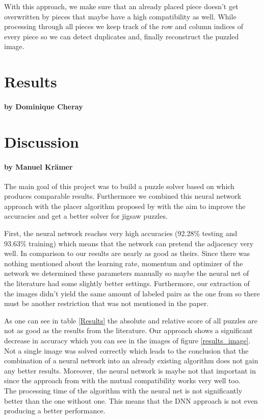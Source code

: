 \documentclass[11pt]{report}
\begin{document}
With this approach, we make sure that an already placed piece doesn't get overwritten by pieces that maybe have a high compatibility as well. While processing through all pieces we keep track of the row and column indices of every piece so we can detect duplicates and, finally reconstruct the puzzled image.


\chapter{Results}
\subsubsection*{by Dominique Cheray}


\chapter{Discussion}
\subsubsection*{by Manuel Krämer}

The main goal of this project was to build a puzzle solver based on \cite{sholomon2016dnn} which produces comparable results. Furthermore we combined this neural network approach with the placer algorithm proposed by \cite{Paikin2015} with the aim to improve the accuracies and get a better solver for jigsaw puzzles.

First, the neural network reaches very high accuracies (92.28\% testing and 93.63\% training) which means that the network can pretend the adjacency very well. In comparison to \cite{sholomon2016dnn} our results are nearly as good as theirs. Since there was nothing mentioned about the learning rate, momentum and optimizer of the network we determined these parameters manually so maybe the neural net of the literature had some slightly better settings. Furthermore, our extraction of the images didn't yield the same amount of labeled pairs as the one from \cite{sholomon2016dnn} so there must be another restriction that was not mentioned in the paper.

As one can see in table \ref{Results} the absolute and relative score of all puzzles are not as good as the results from the literature. Our approach shows a significant decrease in accuracy which you can see in the images of figure \ref{results_image}.
Not a single image was solved correctly which leads to the conclusion that the combination of a neural network into an already existing algorithm does not gain any better results. Moreover, the neural network is maybe not that important in \cite{sholomon2016dnn} since the approach from \cite{Paikin2015} with the mutual compatibility works very well too.\\
The processing time of the algorithm with the neural net is not significantly better than the one without one. This means that the DNN approach is not even producing a better performance. 
\end{document}
